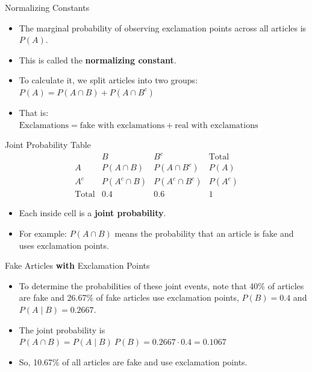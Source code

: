 \documentclass[12pt]{beamer}
\begin{document}
\begin{frame}{}
\begin{block}{Normalizing Constants}
\begin{itemize}
    \item The marginal probability of observing exclamation points across all articles is $P(A)$.
    \item This is called the \textbf{normalizing constant}.
    \pause
    \item To calculate it, we split articles into two groups:\\
          \hspace{2cm}$P(A)=P(A \cap B)+P(A \cap B^c)$
    \item That is:\\ \mbox{$\text{Exclamations} = \text{fake with exclamations} + \text{real with exclamations}$}
\end{itemize}
\end{block}
\end{frame}

\begin{frame}{}
\begin{block}{Joint Probability Table}
\[
\begin{array}{c|ccc}
 & B & B^c & \text{Total} \\
\hline
A & P(A \cap B) & P(A \cap B^c) & P(A) \\
A^c & P(A^c \cap B) & P(A^c \cap B^c) & P(A^c) \\
\hline
\text{Total} & 0.4 & 0.6 & 1
\end{array}
\]
\vspace{0.2cm}
\begin{itemize}
    \item Each inside cell is a \textbf{joint probability}.
    \item For example: $P(A \cap B)$ means the probability that an article is fake and uses exclamation points.
\end{itemize}
\end{block}
\end{frame}

\begin{frame}{}
\begin{block}{Fake Articles \textbf{with} Exclamation Points}
\begin{itemize}
    \item To determine the probabilities of these joint events, note that 40\% of articles are fake and 26.67\% of fake articles use exclamation points, $P(B) = 0.4$ and $P(A \mid B) = 0.2667$. 
    \item The joint probability is
    $P(A \cap B) = P(A \mid B) ~ P(B) = 0.2667 \cdot 0.4 = 0.1067$
    \item So, 10.67\% of all articles are fake and use exclamation points.
\end{itemize}
\end{block}
\end{frame}
\end{document}
